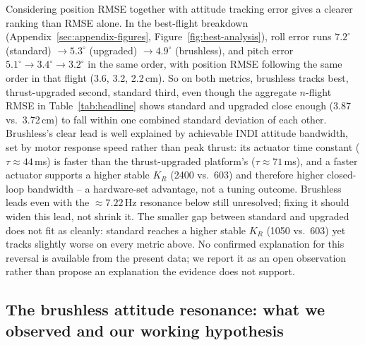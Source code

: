 \documentclass[11pt,a4paper]{article}
\begin{document}
Considering position RMSE together with attitude tracking error gives a clearer ranking than
RMSE alone. In the best-flight breakdown (Appendix~\ref{sec:appendix-figures},
Figure~\ref{fig:best-analysis}), roll error runs $7.2^\circ$ (standard) $\to 5.3^\circ$
(upgraded) $\to 4.9^\circ$ (brushless), and pitch error $5.1^\circ \to 3.4^\circ \to 3.2^\circ$ in
the same order, with position RMSE following the same order in that flight (3.6, 3.2, 2.2\,cm).
So on both metrics, brushless tracks best, thrust-upgraded second, standard third, even though
the aggregate $n$-flight RMSE in Table~\ref{tab:headline} shows standard and upgraded close
enough (3.87 vs.\ 3.72\,cm) to fall within one combined standard deviation of each other.
Brushless's clear lead is well explained by achievable INDI attitude bandwidth, set by motor
response speed rather than peak thrust: its actuator time constant ($\tau\approx44$\,ms) is
faster than the thrust-upgraded platform's ($\tau\approx71$\,ms), and a faster actuator supports a
higher stable $K_R$ (2400 vs.\ 603) and therefore higher closed-loop bandwidth -- a hardware-set
advantage, not a tuning outcome. Brushless leads even with the $\approx7.22$\,Hz resonance below
still unresolved; fixing it should widen this lead, not shrink it. The smaller gap between
standard and upgraded does not fit as cleanly: standard reaches a higher
stable $K_R$ (1050 vs.\ 603) yet tracks slightly worse on every metric above. No confirmed
explanation for this reversal is available from the present data; we report it as an open
observation rather than propose an explanation the evidence does not support.

\subsection{The brushless attitude resonance: what we observed and our working hypothesis}
\label{sec:shake-root-cause}
\end{document}

